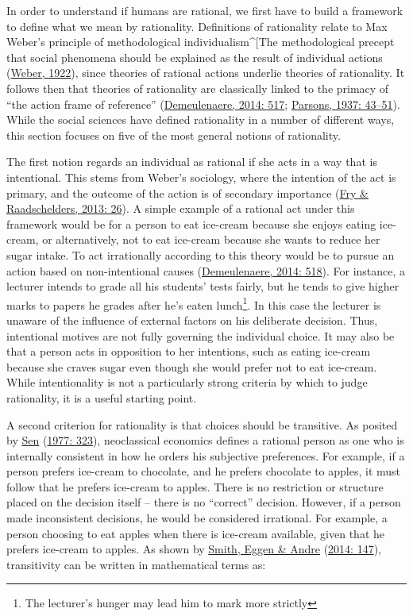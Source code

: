 \documentclass[11pt,preprint, authoryear]{elsarticle}
\numberwithin{equation}{section}
\numberwithin{figure}{section}
\numberwithin{table}{section}
\let\rmarkdownfootnote\footnote%
\def\footnote{\protect\rmarkdownfootnote}
\begin{document}
In order to understand if humans are rational, we first have to build a
framework to define what we mean by rationality. Definitions of
rationality relate to Max Weber's principle of methodological
individualism\^{}{[}The methodological precept that social phenomena
should be explained as the result of individual actions
(\protect\hyperlink{ref-weber}{Weber, 1922}), since theories of rational
actions underlie theories of rationality. It follows then that theories
of rationality are classically linked to the primacy of ``the action
frame of reference'' (\protect\hyperlink{ref-types}{Demeulenaere, 2014:
517}; \protect\hyperlink{ref-parsons}{Parsons, 1937: 43--51}). While the
social sciences have defined rationality in a number of different ways,
this section focuses on five of the most general notions of rationality.

The first notion regards an individual as rational if she acts in a way
that is intentional. This stems from Weber's sociology, where the
intention of the act is primary, and the outcome of the action is of
secondary importance (\protect\hyperlink{ref-fry}{Fry \& Raadschelders,
2013: 26}). A simple example of a rational act under this framework
would be for a person to eat ice-cream because she enjoys eating
ice-cream, or alternatively, not to eat ice-cream because she wants to
reduce her sugar intake. To act irrationally according to this theory
would be to pursue an action based on non-intentional causes
(\protect\hyperlink{ref-types}{Demeulenaere, 2014: 518}). For instance,
a lecturer intends to grade all his students' tests fairly, but he tends
to give higher marks to papers he grades after he's eaten
lunch\footnote{The lecturer's hunger may lead him to mark more strictly}.
In this case the lecturer is unaware of the influence of external
factors on his deliberate decision. Thus, intentional motives are not
fully governing the individual choice. It may also be that a person acts
in opposition to her intentions, such as eating ice-cream because she
craves sugar even though she would prefer not to eat ice-cream. While
intentionality is not a particularly strong criteria by which to judge
rationality, it is a useful starting point.

A second criterion for rationality is that choices should be transitive.
As posited by \protect\hyperlink{ref-sen}{Sen}
(\protect\hyperlink{ref-sen}{1977: 323}), neoclassical economics defines
a rational person as one who is internally consistent in how he orders
his subjective preferences. For example, if a person prefers ice-cream
to chocolate, and he prefers chocolate to apples, it must follow that he
prefers ice-cream to apples. There is no restriction or structure placed
on the decision itself -- there is no ``correct'' decision. However, if
a person made inconsistent decisions, he would be considered irrational.
For example, a person choosing to eat apples when there is ice-cream
available, given that he prefers ice-cream to apples. As shown by
\protect\hyperlink{ref-math}{Smith, Eggen \& Andre}
(\protect\hyperlink{ref-math}{2014: 147}), transitivity can be written
in mathematical terms as:
\end{document}
